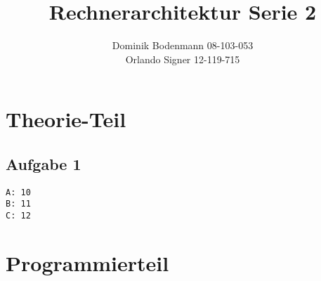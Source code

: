 \documentclass[a4paper,abstracton]{scrartcl}
\title{Rechnerarchitektur Serie 2}
\author{Dominik Bodenmann 08-103-053\\
	Orlando Signer 12-119-715\\}
\begin{document}
\maketitle

\section{Theorie-Teil}
\subsection{Aufgabe 1}
\begin{lstlisting}[caption=Ausgabe]
A: 10
B: 11
C: 12
\end{lstlisting}

\section{Programmierteil}

\newpage

\end{document}
